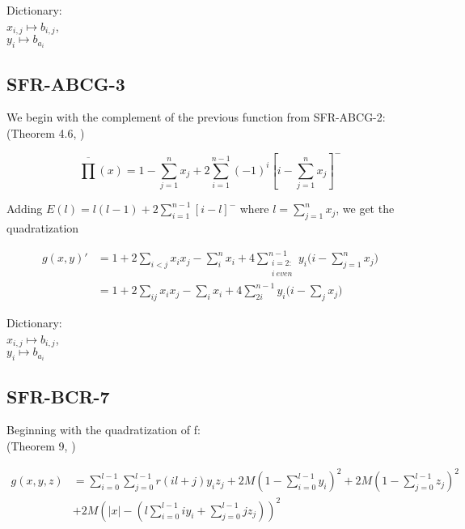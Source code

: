 \documentclass[a4paper,english,notitlepage,longbibliography,showpacs,preprintnumbers,amsmath,amssymb,aps,prx,nofootinbib,12pt,superscriptaddress]{revtex4-1}
\begin{document}
\noindent Dictionary:\\
$x_{i,j}\mapsto b_{i,j}$,\\
$y_{i}\mapsto b_{a_i}$\\



\subsection{SFR-ABCG-3}
We begin with the complement of the previous function from SFR-ABCG-2:
\\(Theorem 4.6, \cite{Anthony2014})

\begin{equation}
  \overline{\prod}(x) = 1 - \sum_{j=1}^n x_j + 2\sum_{i=1}^{n-1}(-1)^{i}\left[i - \sum_{j=1}^{n}x_j\right]^-
\end{equation}

\noindent Adding $E(l) = l(l-1) + 2\sum_{i=1}^{n-1}\left[i-l\right]^-$ where $l = \sum_{j=1}^n x_j$, we get the quadratization

\begin{equation}
\begin{split}
  \left.
  g(x,y)'
  \right.
  &= 1 + 2\sum_{i<j}x_ix_j - \sum_{i}^n x_i + 4\sum_{\substack{i = 2:\\ i\:even}}^{n-1}y_i\Big(i - \sum_{j=1}^n x_j\Big)\\
  &= 1 + 2\sum_{ij}x_ix_j - \sum_{i} x_i + 4\sum_{2i}^{n-1}y_i\Big(i - \sum_{j} x_j\Big)
  \end{split}
\end{equation}

\noindent Dictionary:\\
$x_{i,j}\mapsto b_{i,j}$,\\
$y_{i}\mapsto b_{a_i}$\\



\subsection{SFR-BCR-7}

Beginning with the quadratization of f:
\\(Theorem 9, \cite{Boros2018boundsPaper})

\begin{equation}
  \begin{split}
  \left.
  g(x,y,z)
  \right.
  &= \sum_{i=0}^{l-1}\sum_{j=0}^{l-1}r(il+j)y_iz_j
  + 2M\left(1-\sum_{i=0}^{l-1}y_i\right)^2 + 2M\left(1-\sum_{j=0}^{l-1}z_j\right)^2\\
  &+ 2M\left(|x| - \left(l\sum_{i=0}^{l-1}iy_i + \sum_{j=0}^{l-1}jz_j\right)\right)^2
  \end{split}
\end{equation}
\end{document}
